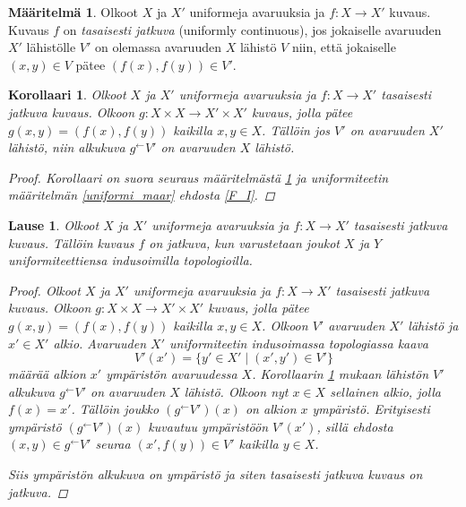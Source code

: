\documentclass[12pt,a4paper,leqno]{report}
\theoremstyle{plain}
\newtheorem{lause}[equation]{Lause}
\newtheorem{kor}[equation]{Korollaari}
\theoremstyle{definition}
\newtheorem{maar}[equation]{Määritelmä}
\theoremstyle{remark}
\begin{document}
\begin{maar}\label{tasaisesti_jatkuva}
Olkoot $X$ ja $X'$ uniformeja avaruuksia 
ja $f\colon X\rightarrow X'$ kuvaus.
Kuvaus $f$ on \emph{tasaisesti jatkuva} (uniformly continuous), jos jokaiselle avaruuden $X'$ lähistölle $V'$ on olemassa avaruuden $X$ lähistö $V$ niin, että jokaiselle $(x,y)\in V$ pätee $(f(x),f(y))\in V'$. 
\end{maar}
\begin{kor}\label{uniformi alkukuva}
Olkoot $X$ ja $X'$ uniformeja avaruuksia 
ja $f\colon X\rightarrow X'$ tasaisesti jatkuva kuvaus. 
Olkoon $g\colon X\times X\rightarrow X'\times X'$ %
kuvaus, jolla pätee $g(x,y)=(f(x),f(y))$ kaikilla $x,y\in X$. 
Tällöin jos $V'$ on avaruuden $X'$ lähistö, niin alkukuva $g^{\leftarrow}V'$ on avaruuden $X$ lähistö.
\begin{proof}
Korollaari on suora seuraus määritelmästä \ref{tasaisesti_jatkuva} ja uniformiteetin määritelmän \ref{uniformi_maar} ehdosta \ref{F_I}.
\end{proof}
\end{kor}
\begin{lause}
Olkoot $X$ ja $X'$ uniformeja avaruuksia 
ja $f\colon X\rightarrow X'$ tasaisesti jatkuva kuvaus. 
Tällöin kuvaus $f$ on jatkuva, %
kun varustetaan joukot $X$ ja $Y$ uniformiteettiensa indusoimilla topologioilla.
\begin{proof}
Olkoot $X$ ja $X'$ uniformeja avaruuksia 
ja $f\colon X\rightarrow X'$ tasaisesti jatkuva kuvaus. 
Olkoon $g\colon X\times X\rightarrow X'\times X'$ %
kuvaus, jolla pätee $g(x,y)=(f(x),f(y))$ kaikilla $x,y\in X$. 
Olkoon $V'$ avaruuden $X'$ lähistö ja $x'\in X'$ alkio. 
Avaruuden $X'$ uniformiteetin indusoimassa topologiassa kaava 
$$V'(x')=\{ y'\in X'\mid (x',y')\in V'\}$$
määrää alkion $x'$ ympäristön avaruudessa $X$.
Korollaarin \ref{uniformi alkukuva} mukaan lähistön $V'$ alkukuva $g^{\leftarrow}V'$ on avaruuden $X$ lähistö.
Olkoon nyt $x\in X$ sellainen alkio, jolla $f(x)=x'$.
Tällöin joukko $(g^{\leftarrow}V')(x)$ on alkion $x$ ympäristö. 
Erityisesti ympäristö $(g^{\leftarrow}V')(x)$ kuvautuu ympäristöön $V'(x')$, 
sillä ehdosta $(x,y)\in g^\leftarrow V'$ seuraa $(x',f(y))\in V' $ kaikilla $y\in X$.
%
%

Siis ympäristön alkukuva on ympäristö ja siten tasaisesti jatkuva kuvaus on jatkuva.
\end{proof}
\end{lause}
\end{document}
